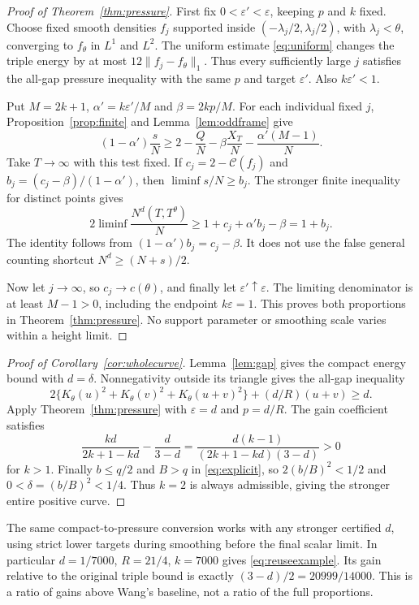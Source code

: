 ﻿\documentclass[11pt]{article}
\theoremstyle{remark}
\newcommand{\cC}{\mathcal C}
\begin{document}
\begin{proof}[Proof of Theorem~\ref{thm:pressure}]
First fix $0<\varepsilon'<\varepsilon$, keeping $p$ and $k$ fixed.
Choose fixed smooth densities $f_j$ supported inside
$(-\lambda_j/2,\lambda_j/2)$, with $\lambda_j<\theta$, converging to
$f_\theta$ in $L^1$ and $L^2$. The uniform estimate
\eqref{eq:uniform} changes the triple energy by at most
$12\|f_j-f_\theta\|_1$. Thus every sufficiently large $j$ satisfies
the all-gap pressure inequality with the same $p$ and target
$\varepsilon'$. Also $k\varepsilon'<1$.

Put $M=2k+1$, $\alpha'=k\varepsilon'/M$ and $\beta=2kp/M$.
For each individual fixed $j$, Proposition~\ref{prop:finite} and
Lemma~\ref{lem:oddframe} give
\[
 (1-\alpha')\frac{s}{N}\ge2-\frac QN
 -\beta\frac{X_T}{N}-\frac{\alpha'(M-1)}{N}.
\]
Take $T\to\infty$ with this test fixed. If $c_j=2-\cC(f_j)$ and
$b_j=(c_j-\beta)/(1-\alpha')$, then $\liminf s/N\ge b_j$.
The stronger finite inequality for distinct points gives
\[
 2\liminf\frac{N^d(T,T^\theta)}{N}
 \ge1+c_j+\alpha'b_j-\beta=1+b_j.
\]
The identity follows from $(1-\alpha')b_j=c_j-\beta$. It does not
use the false general counting shortcut $N^d\ge(N+s)/2$.

Now let $j\to\infty$, so $c_j\to c(\theta)$, and finally let
$\varepsilon'\uparrow\varepsilon$. The limiting denominator is at
least $M-1>0$, including the endpoint $k\varepsilon=1$.
This proves both proportions in Theorem~\ref{thm:pressure}.
No support parameter or smoothing scale varies within a height limit.
\end{proof}

\begin{proof}[Proof of Corollary~\ref{cor:wholecurve}]
Lemma~\ref{lem:gap} gives the compact energy bound with $d=\delta$.
Nonnegativity outside its triangle gives the all-gap inequality
\[
 2\{K_\theta(u)^2+K_\theta(v)^2+K_\theta(u+v)^2\}
 +(d/R)(u+v)\ge d.
\]
Apply Theorem~\ref{thm:pressure} with $\varepsilon=d$ and $p=d/R$.
The gain coefficient satisfies
\[
 \frac{kd}{2k+1-kd}-\frac d{3-d}
 =\frac{d(k-1)}{(2k+1-kd)(3-d)}>0
\]
for $k>1$. Finally $b\le q/2$ and $B>q$ in \eqref{eq:explicit}, so
$2(b/B)^2<1/2$ and $0<\delta=(b/B)^2<1/4$. Thus $k=2$ is always
admissible, giving the stronger entire positive curve.
\end{proof}

The same compact-to-pressure conversion works with any stronger certified
$d$, using strict lower targets during smoothing before the final scalar
limit. In particular $d=1/7000$, $R=21/4$, $k=7000$ gives
\eqref{eq:reuseexample}. Its gain relative to the original triple bound
is exactly $(3-d)/2=20999/14000$. This is a ratio of gains above Wang's
baseline, not a ratio of the full proportions.
\end{document}
